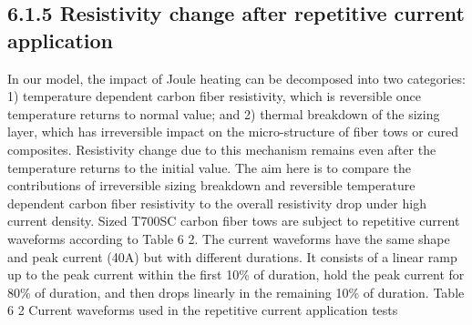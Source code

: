 \subsection{6.1.5	Resistivity change after repetitive current application}
In our model, the impact of Joule heating can be decomposed into two categories: 1) temperature dependent carbon fiber resistivity, which is reversible once temperature returns to normal value; and 2) thermal breakdown of the sizing layer, which has irreversible impact on the micro-structure of fiber tows or cured composites. Resistivity change due to this mechanism remains even after the temperature returns to the initial value.
The aim here is to compare the contributions of irreversible sizing breakdown and reversible temperature dependent carbon fiber resistivity to the overall resistivity drop under high current density. Sized T700SC carbon fiber tows are subject to repetitive current waveforms according to Table 6 2. The current waveforms have the same shape and peak current (40A) but with different durations. It consists of a linear ramp up to the peak current within the first 10\% of duration, hold the peak current for 80\% of duration, and then drops linearly in the remaining 10\% of duration.  
Table 6 2 Current waveforms used in the repetitive current application tests

